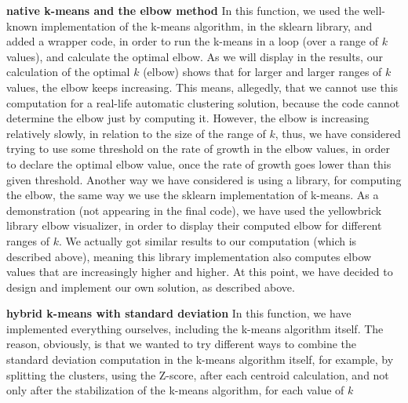 \documentclass[12pt]{article}
\begin{document}
\textbf{native k-means and the elbow method} \newline
In this function, we used the well-known implementation of the k-means algorithm, in the sklearn library, and added a wrapper code, in order to run the k-means in a loop (over a range of $k$ values), and calculate the optimal elbow. \newline
As we will display in the results, our calculation of the optimal $k$ (elbow) shows that for larger and larger ranges of $k$ values, the elbow keeps increasing. This means, allegedly, that we cannot use this computation for a real-life automatic clustering solution, because the code cannot determine the elbow just by computing it. \newline
However, the elbow is increasing relatively slowly, in relation to the size of the range of $k$, thus, we have considered trying to use some threshold on the rate of growth in the elbow values, in order to declare the optimal elbow value, once the rate of growth goes lower than  this given threshold. \newline
Another way we have considered is using a library, for computing the elbow, the same way we use the sklearn implementation of k-means. \newline
As a demonstration (not appearing in the final code), we have used the yellowbrick library elbow visualizer, in order to display their computed elbow for different ranges of $k$. We actually got similar results to our computation (which is described above), meaning this library implementation also computes elbow values that are increasingly higher and higher. \newline
At this point, we have decided to design and implement our own solution, as described above. \newline

\textbf{hybrid k-means with standard deviation} \newline
In this function, we have implemented everything ourselves, including the k-means algorithm itself. \newline
The reason, obviously, is that we wanted to try different ways to combine the standard deviation computation in the k-means algorithm itself, for example, by splitting the clusters, using the Z-score, after each centroid calculation, and not only after the stabilization of the k-means algorithm,
for each value of $k$\newline 
\end{document}
